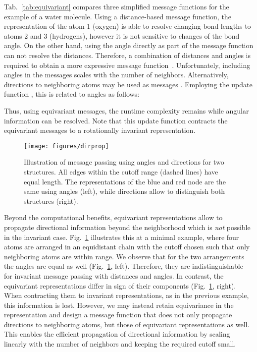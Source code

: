 \documentclass[reprint,
amsmath,amssymb,
 aip,jcp
]{revtex4-2}
\begin{document}
Tab.~\ref{tab:equivariant} compares three simplified message functions for the example of a water molecule.
Using a distance-based message function, the representation of the atom 1 (oxygen) is able to resolve changing bond lengths to atoms 2 and 3 (hydrogens), however it is not sensitive to changes of the bond angle.
On the other hand, using the angle directly as part of the message function can not resolve the distances.
Therefore, a combination of distances and angles is required to obtain a more expressive message function~\cite{klicpera2020directional}.
Unfortunately, including angles in the messages scales  with the number of neighbors.
Alternatively, directions to neighboring atoms may be used as messages .
Employing the update function , this is related to angles as follows:

Thus, using equivariant messages, the runtime complexity remains  while angular information can be resolved.
Note that this update function contracts the equivariant messages to a rotationally invariant representation.

\begin{figure}[tb]
    \centering
    \texttt{[image: figures/dirprop]}
    \caption{Illustration of message passing using angles and directions for two structures. All edges within the cutoff range (dashed lines) have equal length. The representations of the blue and red node are the same using angles (left), while directions allow to distinguish both structures (right). }
    \label{fig:dirprop}
\end{figure}

Beyond the computational benefits, equivariant representations allow to propagate directional information beyond the neighborhood which is \emph{not} possible in the invariant case.
Fig.~\ref{fig:dirprop} illustrates this at a minimal example, where four atoms are arranged in an equidistant chain with the cutoff chosen such that only neighboring atoms are within range.
We observe that for the two arrangements the angles are equal as well (Fig.~\ref{fig:dirprop}, left).
Therefore, they are indistinguishable for invariant message passing with distances and angles.
In contrast, the equivariant representations differ in sign of their components (Fig.~\ref{fig:dirprop}, right).
When contracting them to invariant representations, as in the previous example, this information is lost.
However, we may instead retain equivariance in the representation and design a message function  that does not only propagate directions to neighboring atoms, but those of equivariant representations as well.
This enables the efficient propagation of directional information by scaling linearly with the number of neighbors and keeping the required cutoff small.
\end{document}
